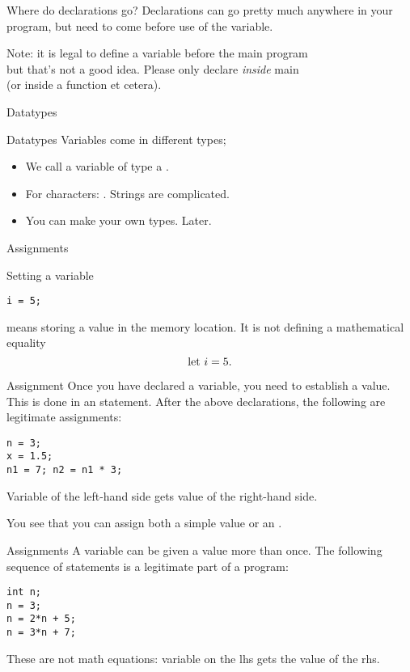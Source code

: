 \begin{block}{Where do declarations go?}
  \label{sl:declwhere}
  Declarations can go pretty much anywhere in your program, but need
  to come before use of the variable.

  Note: it is legal to define a variable before the main program\\
  but that's not a good idea. Please only declare \emph{inside} main\\
  (or inside a function et cetera).
\end{block}

 {Datatypes}

\begin{block}{Datatypes}
  \label{sl:datatypes}
  Variables come in different types;
  \begin{itemize}
  \item We call a variable of type
     a .
  \item 
    For characters: . Strings are complicated.
  \item 
    You can make your own types. Later.
  \end{itemize}
\end{block}

 {Assignments}
\label{sec:ctypes}

Setting a variable
\begin{verbatim}
i = 5;
\end{verbatim}
means storing a value in the memory location. It is
not defining a mathematical equality
\[ \hbox{let $i=5$}. \]

\begin{block}{Assignment}
  \label{sl:assign1}
  Once you have declared a variable, you need to establish a value. This is done in an
   statement. After the above declarations, the
  following are legitimate assignments:
\begin{verbatim}
n = 3;
x = 1.5;
n1 = 7; n2 = n1 * 3;
\end{verbatim}
Variable of the left-hand side gets value of the right-hand side.

You see that you can assign both a simple value or an
.
\end{block}

\begin{block}{Assignments}
  \label{sl:assign2}
  A variable can be given a value more than once. The following
  sequence of statements is a legitimate part of a program:
\begin{verbatim}
int n;
n = 3;
n = 2*n + 5;
n = 3*n + 7;
\end{verbatim}
These are not math equations: variable on the lhs gets the value of
the rhs.
\end{block}

